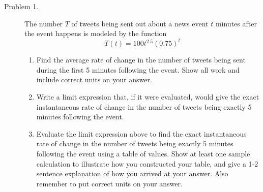 \documentclass[addpoints]{exam}
\begin{document}
\begin{description}



	\item[Problem 1.] The number $T$ of tweets being sent out about a news event $t$ minutes after the event happens is modeled by the function 
	$$T(t) = 100t^{2.5} (0.75)^t$$
	\begin{enumerate}
		\item Find the average rate of change in the number of tweets being sent during the first 5 minutes following the event. Show all work and include correct units on your answer. 
		\item Write a limit expression that, if it were evaluated, would give the exact instantaneous rate of change in the number of tweets being exactly 5 minutes following the event. 
		\item Evaluate the limit expression above to find the exact instantaneous rate of change in the number of tweets being exactly 5 minutes following the event using a table of values. Show at least one sample calculation to illustrate how you constructed your table, and give a 1-2 sentence explanation of how you arrived at your answer. Also remember to put correct units on your answer. 
	\end{enumerate}


\hrulefill



\end{description}
\end{document}
